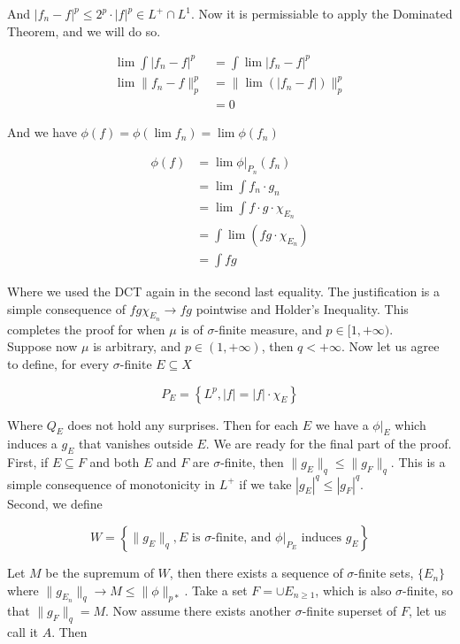 \documentclass[../../main.tex]{subfiles}
\begin{document}
And $|f_n -f|^p \leq 2^p\cdot |f|^p \in L^+\cap L^1$. Now it is permissiable to apply the Dominated Theorem, and we will do so.

\begin{align*}
    \lim \int |f_n -f|^p &= \int \lim |f_n-f|^p\\
    \lim \lVert f_n -f \rVert^p_p &= \lVert \lim (|f_n - f|) \rVert^p_p\\
    &= 0
\end{align*}

And we have $\phi(f) = \phi(\lim f_n) = \lim\phi(f_n)$

\begin{align*}
    \phi(f) &= \lim \phi|_{P_n}(f_n)\\
    &= \lim \int f_n\cdot g_n\\
    &= \lim \int f\cdot g\cdot\chi_{E_n}\\
    &= \int \lim\left(fg\cdot\chi_{E_n}\right)\\
    &= \int fg
\end{align*}

Where we used the DCT again in the second last equality. The justification is a simple consequence of $fg\chi_{E_n}\to fg$ pointwise and Holder's Inequality. This completes the proof for when $\mu$ is of $\sigma$-finite measure, and $p\in[1,+\infty)$.\\

Suppose now $\mu$ is arbitrary, and $p\in(1,+\infty)$, then $q<+\infty$. Now let us agree to define, for every $\sigma$-finite $E\subseteq X$

$$
P_E = \left\{L^p, |f| = |f|\cdot\chi_E\right\}
$$

Where $Q_E$ does not hold any surprises. Then for each $E$ we have a $\phi|_E$ which induces a $g_E$ that vanishes outside $E$. We are ready for the final part of the proof.\\

First, if $E\subseteq F$ and both $E$ and $F$ are $\sigma$-finite, then $\lVert g_E\rVert_q \leq \lVert g_F\rVert_q$. This is a simple consequence of monotonicity in $L^+$ if we take $|g_E|^q\leq |g_F|^q$.\\ 

Second, we define

$$
W = \left\{\lVert g_E\rVert_q, E \text{ is } \sigma \text{-finite, and }\phi|_{P_E} \text{ induces } g_E\right\}
$$

Let $M$ be the supremum of $W$, then there exists a sequence of $\sigma$-finite sets, $\{E_n\}$ where $\lVert g_{E_n}\rVert_q \to M\leq \lVert \phi \rVert_{p*}$. Take a set $F = \cup E_{n\geq 1}$, which is also $\sigma$-finite, so that $\lVert g_F \rVert_q = M$. Now assume there exists another $\sigma$-finite superset of $F$, let us call it $A$. Then 
\end{document}
